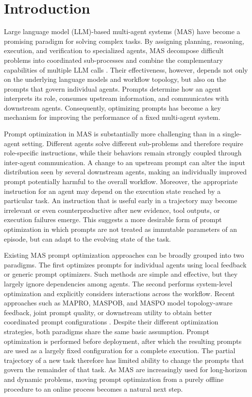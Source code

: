 \section{Introduction}
\label{sec:introduction}

Large language model (LLM)-based multi-agent systems (MAS) have become a promising paradigm for solving complex tasks.
By assigning planning, reasoning, execution, and verification to specialized agents, MAS decompose difficult problems into coordinated sub-processes and combine the complementary capabilities of multiple LLM calls
\citep{wu2023autogen,li2023camel,chen2023agentverse,yao2024multiagent}.
Their effectiveness, however, depends not only on the underlying language models and workflow topology, but also on the prompts that govern individual agents.
Prompts determine how an agent interprets its role, consumes upstream information, and communicates with downstream agents.
Consequently, optimizing prompts has become a key mechanism for improving the performance of a fixed multi-agent system.

Prompt optimization in MAS is substantially more challenging than in a single-agent setting.
Different agents solve different sub-problems and therefore require role-specific instructions, while their behaviors remain strongly coupled through inter-agent communication.
A change to an upstream prompt can alter the input distribution seen by several downstream agents, making an individually improved prompt potentially harmful to the overall workflow.
Moreover, the appropriate instruction for an agent may depend on the execution state reached by a particular task.
An instruction that is useful early in a trajectory may become irrelevant or even counterproductive after new evidence, tool outputs, or execution failures emerge.
This suggests a more desirable form of prompt optimization in which prompts are not treated as immutable parameters of an episode, but can adapt to the evolving state of the task.

Existing MAS prompt optimization approaches can be broadly grouped into two paradigms.
The first optimizes prompts for individual agents using local feedback or generic prompt optimizers.
Such methods are simple and effective, but they largely ignore dependencies among agents.
The second performs system-level optimization and explicitly considers interactions across the workflow.
Recent approaches such as MAPRO, MASPOB, and MASPO model topology-aware feedback, joint prompt quality, or downstream utility to obtain better coordinated prompt configurations
\citep{mapro2026,hong2026maspob,wang2026maspo}.
Despite their different optimization strategies, both paradigms share the same basic assumption.
Prompt optimization is performed before deployment, after which the resulting prompts are used as a largely fixed configuration for a complete execution.
The partial trajectory of a new task therefore has limited ability to change the prompts that govern the remainder of that task.
As MAS are increasingly used for long-horizon and dynamic problems, moving prompt optimization from a purely offline procedure to an online process becomes a natural next step.

